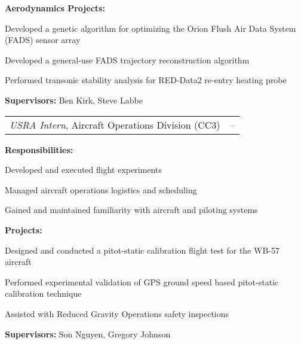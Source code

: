 \documentclass[letterpaper,MMMyyyy,nonstop]{simpleresumecv}
\makeatletter
\newcommand{\headerrow}[2]
{\begin{tabular*}{\linewidth}{l@{\extracolsep{\fill}}r}
    #1 &
    #2 \\
\end{tabular*}}
\makeatother
\begin{document}
\begin{itemize}
\begin{itemize*}
            \item \textbf{Aerodynamics Projects:}
            \begin{itemize*}
                \item Developed a genetic algorithm for optimizing the Orion Flush Air Data System (FADS) sensor array
                \item Developed a general-use FADS trajectory reconstruction algorithm
                \item Performed transonic stability analysis for RED-Data2 re-entry heating probe
            \end{itemize*}
            \item \textbf{Supervisors:} Ben Kirk, Steve Labbe
        \end{itemize*}

        \headerrow
        {\emph{USRA Intern}, Aircraft Operations Division (CC3)}
        {\emph{\DatestampYMD{2013}{07}{08} -- \DatestampYMD{2013}{09}{13}}}

        \begin{itemize*}
            \item \textbf{Responsibilities:}
            \begin{itemize*}
                \item Developed and executed flight experiments
                \item Managed aircraft operations logistics and scheduling
                \item Gained and maintained familiarity with aircraft and piloting systems
            \end{itemize*}

            \item \textbf{Projects:}
            \begin{itemize*}
                \item Designed and conducted a pitot-static calibration flight test for the WB-57 aircraft
                \item Performed experimental validation of GPS ground speed based pitot-static calibration technique
                \item Assisted with Reduced Gravity Operations safety inspections
            \end{itemize*}

            \item \textbf{Supervisors:} Son Nguyen, Gregory Johnson
        \end{itemize*}


\end{itemize}
\end{document}
